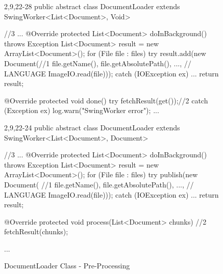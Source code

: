 \begin{figure}[H]
\begin{minipage}{0.48\textwidth}
\begin{sourcecode}
\begin{javacode}{2,9,22-28}
public abstract class DocumentLoader 
	extends SwingWorker<List<Document>, Void> { //3$\label{codeline:DocumentLoader-3a}$
    ...
    @Override
    protected List<Document> doInBackground() throws Exception {
        List<Document> result = new ArrayList<Document>();
        for (File file : files) {
            try {
                result.add(new Document(//1$\label{codeline:DocumentLoader-1a}$
                        file.getName(),
                        file.getAbsolutePath(),
                        ..., // LANGUAGE
                        ImageIO.read(file)));
            } catch (IOException ex) {
                ...
            }
        }
        return result;
    }

    @Override
    protected void done() {
        try {
            fetchResult(get());//2$\label{codeline:DocumentLoader-2a}$
        } catch (Exception ex) {
            log.warn("SwingWorker error");
        }
    }
    ...
}
\end{javacode}
\caption{DocumentLoader Class - Original Code}
\label{code:example-original-v1}
\end{sourcecode}
\end{minipage}\hspace{0.7cm}
\begin{minipage}{0.48\textwidth}
\begin{sourcecode}
\begin{javacode}{2,9,22-24}
public abstract class DocumentLoader 
	extends SwingWorker<List<Document>, Document> { //3$\label{codeline:DocumentLoader-3b}$
	...
    @Override
    protected List<Document> doInBackground() throws Exception {
        List<Document> result = new ArrayList<Document>();
        for (File file : files) {
            try {
                publish(new Document( //1$\label{codeline:DocumentLoader-1b}$
                        file.getName(),
                        file.getAbsolutePath(),
                        ..., // LANGUAGE
                        ImageIO.read(file)));
            } catch (IOException ex) {
                ...
            }
        }
        return result;
    }

    @Override
    protected void process(List<Document> chunks){ //2$\label{codeline:DocumentLoader-2b}$
        fetchResult(chunks);
    }

    ...
}
\end{javacode}
\caption{DocumentLoader Class - Pre-Processing}
\label{code:example-pre-processing}
\end{sourcecode}
\end{minipage}
\end{figure}